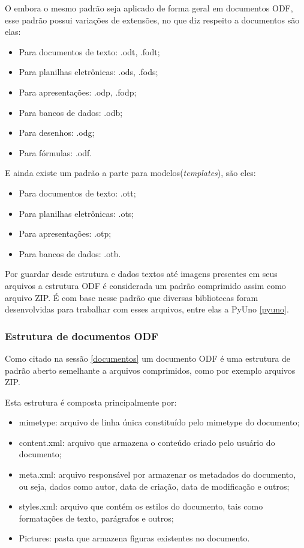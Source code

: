 O embora o mesmo padrão seja aplicado de forma geral em documentos ODF, esse padrão possui variações de extensões, no que diz respeito a documentos são elas:

\begin{itemize}
    \item{Para documentos de texto: .odt, .fodt;}
    \item{Para planilhas eletrônicas: .ods, .fods;}
    \item{Para apresentações: .odp, .fodp;}
    \item{Para bancos de dados: .odb;}
    \item{Para desenhos: .odg;}
    \item{Para fórmulas: .odf.}
\end{itemize}

E ainda existe um padrão a parte para modelos(\textit{templates}), são eles:

\begin{itemize}
    \item{Para documentos de texto: .ott;}
    \item{Para planilhas eletrônicas: .ots;}
    \item{Para apresentações: .otp;}
    \item{Para bancos de dados: .otb.}
\end{itemize}

Por guardar desde estrutura e dados textos até imagens presentes em seus arquivos a estrutura ODF é considerada um padrão comprimido assim como arquivo ZIP. É com base nesse padrão que diversas bibliotecas foram desenvolvidas para trabalhar com esses arquivos, entre elas a PyUno \ref{pyuno}.

\subsubsection{Estrutura de documentos ODF}

Como citado na sessão \ref{documentos} um documento ODF é uma estrutura de padrão aberto semelhante a arquivos comprimidos, como por exemplo arquivos ZIP.

Esta estrutura é composta principalmente por:

\begin{itemize}
    \item{mimetype: arquivo de linha única constituído pelo mimetype do documento;}
    \item{content.xml: arquivo que armazena o conteúdo criado pelo usuário do documento;}
    \item{meta.xml: arquivo responsável por armazenar os metadados do documento, ou seja, dados como autor, data de criação, data de modificação e outros;}
    \item{styles.xml: arquivo que contém os estilos do documento, tais como formatações de texto, parágrafos e outros;}
    \item{Pictures: pasta que armazena figuras existentes no documento.}
\end{itemize}


